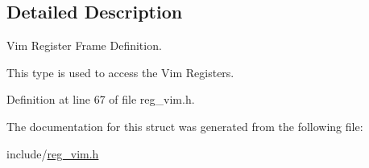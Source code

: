 \subsection{Detailed Description}
Vim Register Frame Definition. 

This type is used to access the Vim Registers. 

Definition at line 67 of file reg\+\_\+vim.\+h.



The documentation for this struct was generated from the following file\+:\begin{DoxyCompactItemize}
\item 
include/\mbox{\hyperlink{reg__vim_8h}{reg\+\_\+vim.\+h}}\end{DoxyCompactItemize}
